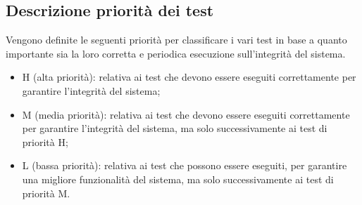 \subsection{Descrizione priorità dei test}

Vengono definite le seguenti priorità per classificare i vari test in base a quanto importante sia la
loro corretta e periodica esecuzione sull'integrità del sistema.
\begin{itemize}
    \item H (alta priorità): relativa ai test che devono essere eseguiti correttamente per garantire l'integrità
          del sistema;
    \item M (media priorità): relativa ai test che devono essere eseguiti correttamente per garantire l'integrità
          del sistema, ma solo successivamente ai test di priorità H;
    \item L (bassa priorità): relativa ai test che possono essere eseguiti, per garantire una migliore funzionalità
          del sistema, ma solo successivamente ai test di priorità M.
\end{itemize}



